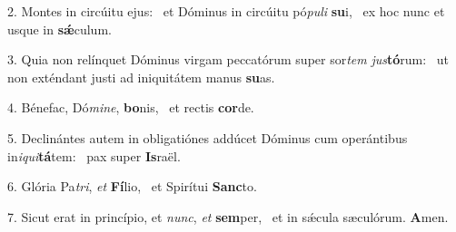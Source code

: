 2. Montes in circúitu ejus: \dag\  et Dóminus in circúitu pó\textit{pu}\textit{li} \textbf{su}i, \ast\  ex hoc nunc et usque in \textbf{sǽ}culum.\

3. Quia non relínquet Dóminus virgam peccatórum super sor\textit{tem} \textit{jus}\textbf{tó}rum: \ast\  ut non exténdant justi ad iniquitátem manus \textbf{su}as.\

4. Bénefac, Dó\textit{mi}\textit{ne}, \textbf{bo}nis, \ast\  et rectis \textbf{cor}de.\

5. Declinántes autem in obligatiónes addúcet Dóminus cum operántibus in\textit{i}\textit{qui}\textbf{tá}tem: \ast\  pax super \textbf{Is}raël.\

6. Glória Pa\textit{tri}, \textit{et} \textbf{Fí}lio, \ast\  et Spirítui \textbf{Sanc}to.\

7. Sicut erat in princípio, et \textit{nunc}, \textit{et} \textbf{sem}per, \ast\  et in sǽcula sæculórum. \textbf{A}men.\

